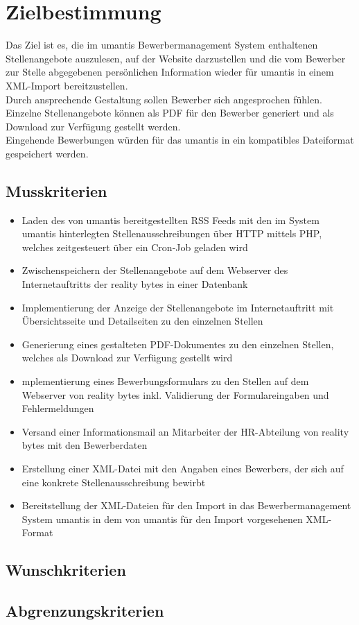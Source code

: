 \section{Zielbestimmung}

    Das Ziel ist es, die im umantis Bewerbermanagement System enthaltenen Stellenangebote auszulesen, auf der Website darzustellen und die vom Bewerber zur Stelle abgegebenen persönlichen Information wieder für umantis in einem XML-Import bereitzustellen. \\
    Durch ansprechende Gestaltung sollen Bewerber sich angesprochen fühlen. Einzelne Stellenangebote können als PDF für den Bewerber generiert und als Download zur Verfügung gestellt werden. \\
    Eingehende Bewerbungen würden für das umantis in ein kompatibles Dateiformat gespeichert werden.

    \subsection{Musskriterien}

        \begin{itemize}
            \item Laden des von umantis bereitgestellten RSS Feeds mit den im System umantis hinterlegten Stellenausschreibungen über HTTP mittels PHP, welches zeitgesteuert über ein Cron-Job geladen wird
            \item Zwischenspeichern der Stellenangebote auf dem Webserver des Internetauftritts der reality bytes in einer Datenbank
            \item Implementierung der Anzeige der Stellenangebote im Internetauftritt mit Übersichtsseite und Detailseiten zu den einzelnen Stellen
            \item Generierung eines gestalteten PDF-Dokumentes zu den einzelnen Stellen, welches als Download zur Verfügung gestellt wird
            \item mplementierung eines Bewerbungsformulars zu den Stellen auf dem Webserver von reality bytes inkl. Validierung der Formulareingaben und Fehlermeldungen
            \item Versand einer Informationsmail an Mitarbeiter der HR-Abteilung von reality bytes mit den Bewerberdaten
            \item Erstellung einer XML-Datei mit den Angaben eines Bewerbers, der sich auf eine konkrete Stellenausschreibung bewirbt
            \item Bereitstellung der XML-Dateien für den Import in das Bewerbermanagement System umantis in dem von umantis für den Import vorgesehenen XML-Format
        \end{itemize}

    \subsection{Wunschkriterien}



    \subsection{Abgrenzungskriterien}


